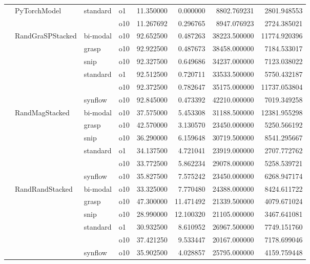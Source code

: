 \begin{longtable}{llllrrrr}
      & PyTorchModel & standard & o1 &  11.350000 &   0.000000 &      8802.769231 &   2801.948553 \\
      &     &         & o10 &  11.267692 &   0.296765 &      8947.076923 &   2724.385021 \\
      & RandGraSPStacked & bi-modal & o10 &  92.652500 &   0.487263 &     38223.500000 &  11774.920396 \\
      &     & grasp & o10 &  92.922500 &   0.487673 &     38458.000000 &   7184.533017 \\
      &     & snip & o10 &  92.327500 &   0.649686 &     34237.000000 &   7123.038022 \\
      &     & standard & o1 &  92.512500 &   0.720711 &     33533.500000 &   5750.432187 \\
      &     &         & o10 &  92.372500 &   0.782647 &     35175.000000 &  11737.053804 \\
      &     & synflow & o10 &  92.845000 &   0.473392 &     42210.000000 &   7019.349258 \\
      & RandMagStacked & bi-modal & o10 &  37.575000 &   5.453308 &     31188.500000 &  12381.955298 \\
      &     & grasp & o10 &  42.570000 &   3.130570 &     23450.000000 &   5250.566192 \\
      &     & snip & o10 &  36.290000 &   6.159648 &     30719.500000 &   8541.295667 \\
      &     & standard & o1 &  34.137500 &   4.721041 &     23919.000000 &   2707.772762 \\
      &     &         & o10 &  33.772500 &   5.862234 &     29078.000000 &   5258.539721 \\
      &     & synflow & o10 &  35.827500 &   7.575242 &     23450.000000 &   6268.947174 \\
      & RandRandStacked & bi-modal & o10 &  33.325000 &   7.770480 &     24388.000000 &   8424.611722 \\
      &     & grasp & o10 &  47.300000 &  11.471492 &     21339.500000 &   4079.671024 \\
      &     & snip & o10 &  28.990000 &  12.100320 &     21105.000000 &   3467.641081 \\
      &     & standard & o1 &  30.932500 &   8.610952 &     26967.500000 &   7749.151760 \\
      &     &         & o10 &  37.421250 &   9.533447 &     20167.000000 &   7178.699046 \\
      &     & synflow & o10 &  35.902500 &   4.028857 &     25795.000000 &   4159.759448 \\

\end{longtable}
